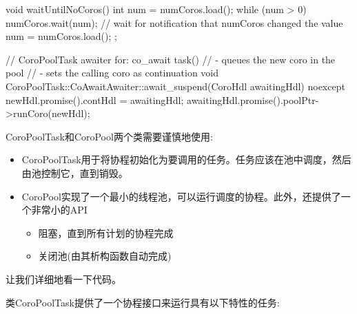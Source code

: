 \begin{cpp}
{	void waitUntilNoCoros() {
		int num = numCoros.load();
		while (num > 0) {
		numCoros.wait(num); // wait for notification that numCoros changed the value
		num = numCoros.load();
		}
	}
};

// CoroPoolTask awaiter for: co_await task()
// - queues the new coro in the pool
// - sets the calling coro as continuation
void CoroPoolTask::CoAwaitAwaiter::await_suspend(CoroHdl awaitingHdl) noexcept
{
	newHdl.promise().contHdl = awaitingHdl;
	awaitingHdl.promise().poolPtr->runCoro(newHdl);
}
\end{cpp}

CoroPoolTask和CoroPool两个类需要谨慎地使用:

\begin{itemize}
\item 
CoroPoolTask用于将协程初始化为要调用的任务。任务应该在池中调度，然后由池控制它，直到销毁。

\item 
CoroPool实现了一个最小的线程池，可以运行调度的协程。此外，还提供了一个非常小的API
\begin{itemize}
\item 
阻塞，直到所有计划的协程完成

\item
关闭池(由其析构函数自动完成)
\end{itemize}
\end{itemize}

让我们详细地看一下代码。


类CoroPoolTask提供了一个协程接口来运行具有以下特性的任务:

